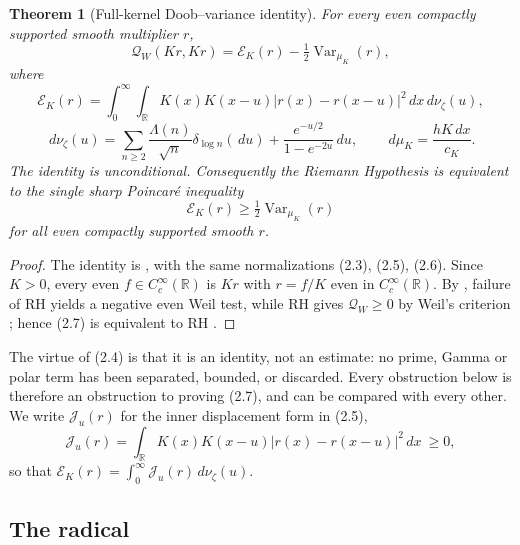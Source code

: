 \documentclass[11pt]{amsart}
\newtheorem{theorem}{Theorem}[section]
\theoremstyle{definition}
\theoremstyle{remark}
\newcommand{\R}{\mathbb R}
\newcommand{\dd}{\,d}
\newcommand{\QW}{\mathcal Q_W}
\newcommand{\EK}{\mathscr E_K}
\DeclareMathOperator{\Var}{Var}
\begin{document}
\begin{theorem}[Full-kernel Doob--variance identity]
\label{thm:doob}
For every even compactly supported smooth multiplier \(r\),
\[
 \boxed{
 \QW(Kr,Kr)=\EK(r)-\tfrac12\Var_{\mu_K}(r),}
\tag{2.4}
\]
where
\[
 \EK(r)=\int_0^\infty\!\!\int_\R
 K(x)K(x-u)|r(x)-r(x-u)|^2\dd x\dd\nu_\zeta(u),
\tag{2.5}
\]
\[
 \dd\nu_\zeta(u)=\sum_{n\ge2}\frac{\Lambda(n)}{\sqrt n}\delta_{\log n}(\dd u)
 +\frac{e^{-u/2}}{1-e^{-2u}}\dd u,
 \qquad
 \dd\mu_K=\frac{hK\dd x}{c_K}.
\tag{2.6}
\]
The identity is unconditional.  Consequently the Riemann Hypothesis is
equivalent to the single sharp Poincar\'e inequality
\[
 \boxed{\EK(r)\ge\tfrac12\Var_{\mu_K}(r)}
\tag{2.7}
\]
for all even compactly supported smooth \(r\).
\end{theorem}

\begin{proof}
The identity is \cite[Theorem~23.1]{TrejoPizzo39}, with the same
normalizations (2.3), (2.5), (2.6).  Since \(K>0\), every even
\(f\in C_c^\infty(\R)\) is \(Kr\) with \(r=f/K\) even in
\(C_c^\infty(\R)\).  By \cite[Theorem~13.2]{TrejoPizzo39}, failure of RH
yields a negative even Weil test, while RH gives \(\QW\ge0\) by Weil's
criterion \cite{Weil1952}; hence (2.7) is equivalent to RH
\cite[Corollary~23.2]{TrejoPizzo39}.
\end{proof}

The virtue of (2.4) is that it is an identity, not an estimate: no prime,
Gamma or polar term has been separated, bounded, or discarded.  Every
obstruction below is therefore an obstruction to proving (2.7), and can
be compared with every other.  We write \(\mathcal J_u(r)\) for the inner
displacement form in (2.5),
\[
 \mathcal J_u(r)=\int_\R K(x)K(x-u)|r(x)-r(x-u)|^2\dd x\ \ge0 ,
\tag{2.8}
\]
so that \(\EK(r)=\int_0^\infty\mathcal J_u(r)\dd\nu_\zeta(u)\).

\subsection{The radical}
\end{document}
